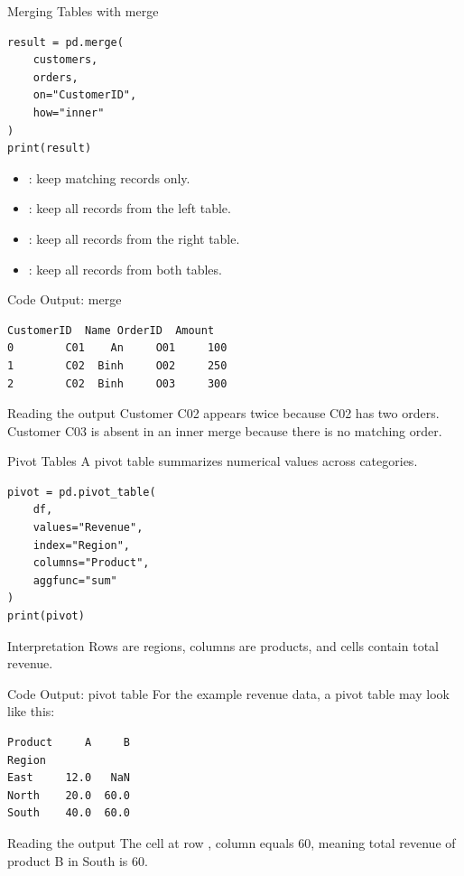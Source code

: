 \documentclass[aspectratio=169,11pt]{beamer}
\newcommand{\cmd}[1]{\texttt{\detokenize{#1}}}
\begin{document}
\begin{frame}[fragile]{Merging Tables with merge}
\small
\begin{lstlisting}[style=py]
result = pd.merge(
    customers,
    orders,
    on="CustomerID",
    how="inner"
)
print(result)
\end{lstlisting}
\begin{itemize}
  \item \cmd{inner}: keep matching records only.
  \item \cmd{left}: keep all records from the left table.
  \item \cmd{right}: keep all records from the right table.
  \item \cmd{outer}: keep all records from both tables.
\end{itemize}
\end{frame}

\begin{frame}[fragile]{Code Output: merge}
\small
\begin{lstlisting}[style=py]
  CustomerID  Name OrderID  Amount
0        C01    An     O01     100
1        C02  Binh     O02     250
2        C02  Binh     O03     300
\end{lstlisting}
\begin{block}{Reading the output}
Customer C02 appears twice because C02 has two orders. Customer C03 is absent in an inner merge because there is no matching order.
\end{block}
\end{frame}

\begin{frame}[fragile]{Pivot Tables}
\small
A pivot table summarizes numerical values across categories.
\begin{lstlisting}[style=py]
pivot = pd.pivot_table(
    df,
    values="Revenue",
    index="Region",
    columns="Product",
    aggfunc="sum"
)
print(pivot)
\end{lstlisting}
\begin{block}{Interpretation}
Rows are regions, columns are products, and cells contain total revenue.
\end{block}
\end{frame}

\begin{frame}[fragile]{Code Output: pivot table}
\small
For the example revenue data, a pivot table may look like this:
\begin{lstlisting}[style=py]
Product     A     B
Region             
East     12.0   NaN
North    20.0  60.0
South    40.0  60.0
\end{lstlisting}
\begin{block}{Reading the output}
The cell at row \cmd{South}, column \cmd{B} equals 60, meaning total revenue of product B in South is 60.
\end{block}
\end{frame}
\end{document}
